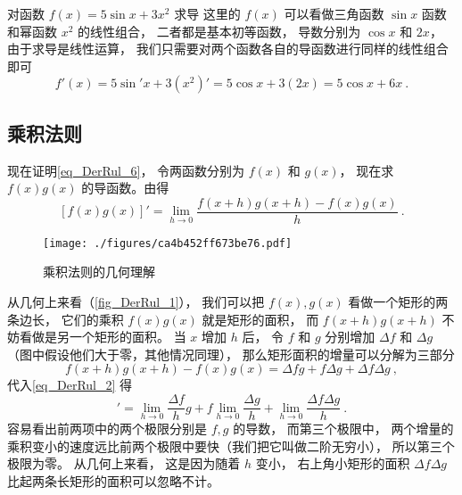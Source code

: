 \begin{example}{对函数 $f(x) = 5\sin x + 3x^2$ 求导}
这里的 $f(x)$ 可以看做三角函数 $\sin x$ 函数和幂函数 $x^2$ 的线性组合， 二者都是基本初等函数， 导数分别为 $\cos x$ 和 $2x$， 由于求导是线性运算， 我们只需要对两个函数各自的导函数进行同样的线性组合即可
\begin{equation}
f'(x) = 5 \sin' x + 3(x^2)' = 5 \cos x + 3(2x) = 5\cos x + 6x~.
\end{equation}
\end{example}

\subsection{乘积法则}
现在证明\autoref{eq_DerRul_6}， 令两函数分别为 $f(x)$ 和 $g(x)$， 现在求 $f(x) g(x)$ 的导函数。由得
\begin{equation}\label{eq_DerRul_2}
[f(x)g(x)]' = \lim_{h\to 0} \frac{f(x+h)g(x+h) - f(x)g(x)}{h}~.
\end{equation}

\begin{figure}[ht]
\centering
\texttt{[image: ./figures/ca4b452ff673be76.pdf]}
\caption{乘积法则的几何理解} \label{fig_DerRul_1}
\end{figure}

从几何上来看（\autoref{fig_DerRul_1}）， 我们可以把 $f(x), g(x)$ 看做一个矩形的两条边长， 它们的乘积 $f(x)g(x)$ 就是矩形的面积， 而 $f(x+h)g(x+h)$ 不妨看做是另一个矩形的面积。 当 $x$ 增加 $h$ 后， 令 $f$ 和 $g$ 分别增加 $\Delta f$ 和 $\Delta g$ （图中假设他们大于零，其他情况同理）， 那么矩形面积的增量可以分解为三部分
\begin{equation}
f(x+h)g(x+h) - f(x)g(x) = \Delta f g + f \Delta g + \Delta f\Delta g~,
\end{equation}
代入\autoref{eq_DerRul_2} 得
\begin{equation}
[f(x)g(x)]' = \lim_{h\to 0} \frac{\Delta f}{h} g + f \lim_{h\to 0} \frac{\Delta g}{h} + \lim_{h\to 0}\frac{\Delta f\Delta g}{h}~.
\end{equation}
容易看出前两项中的两个极限分别是 $f,g$ 的导数， 而第三个极限中， 两个增量的乘积变小的速度远比前两个极限中要快（我们把它叫做二阶无穷小）， 所以第三个极限为零。 从几何上来看， 这是因为随着 $h$ 变小， 右上角小矩形的面积 $\Delta f\Delta g$ 比起两条长矩形的面积可以忽略不计。

